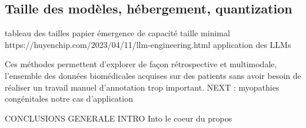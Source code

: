 \subsection{Taille des modèles, hébergement, quantization}
tableau des tailles
papier émergence de capacité taille minimal
https://huyenchip.com/2023/04/11/llm-engineering.html application des LLMs


Ces méthodes permettent d’explorer de façon rétrospective et multimodale, l’ensemble des données biomédicales acquises sur des patients sans avoir besoin de réaliser un travail manuel d’annotation trop important. NEXT : myopathies congénitales notre cas d'application

CONCLUSIONS GENERALE INTRO Into le coeur du propos